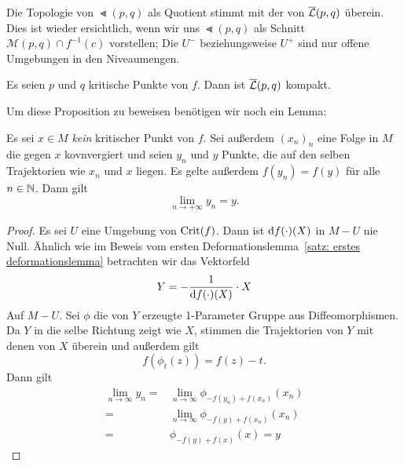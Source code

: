 \begin{remark}
    Die Topologie von $\Lt(p, q)$ als Quotient stimmt mit der von ${\overline{\mathcal{L}} }(p, q)$ überein.
    Dies ist wieder ersichtlich, wenn wir uns $\Lt (p, q)$ als Schnitt 
    $\mathcal{M} (p, q) \cap f^{-1}(c)$ vorstellen; Die $U^-$ beziehungsweise $U^+$ sind nur 
    offene Umgebungen in den Niveaumengen.
\end{remark}

\begin{prop}
    \label{prop: Lb ist kompakt}
    Es seien $p$ und $q$ kritische Punkte von $f$. Dann ist ${\overline{\mathcal{L}} } (p, q)$ kompakt.
\end{prop}

Um diese Proposition zu beweisen benötigen wir noch ein Lemma:

\begin{lemma}
    \label{lemma: konvergenz einer folge}
    Es sei $x \in M$ \emph{kein} kritischer Punkt von $f$. Sei außerdem $(x_n)_n$ eine Folge in
    $M$ die gegen $x$ kovnvergiert und seien $y_n$ und $y$ Punkte, die auf den selben Trajektorien
    wie $x_n$ und $x$ liegen. Es gelte außerdem $f(y_n) = f(y)$ für alle $n \in { \mathbb N }$. Dann gilt
    \[ \lim_{n \to + \infty} y_n = y . \]
\end{lemma}

\begin{proof}
    Es sei $U$ eine Umgebung von ${ \operatorname{Crit} } (f)$. Dann ist ${ \operatorname{d} } f (\cdot) (X)$  in $M - U$ nie Null.
    Ähnlich wie im Beweis vom ersten Deformationslemma~\ref{satz: erstes deformationslemma} betrachten 
    wir das Vektorfeld 
    \[ Y = - \frac{1}{{ \operatorname{d} } f (\cdot) (X)} \cdot X \]
    Auf $M - U$. Sei $\phi$ die von $Y$ erzeugte 1-Parameter Gruppe aus Diffeomorphismen. 
    Da $Y$ in die selbe Richtung zeigt wie $X$, stimmen die Trajektorien von $Y$ mit denen von $X$ 
    überein und außerdem gilt 
    \[ f(\phi_t(z)) = f(z) - t . \]
    Dann gilt
    \begin{align*} 
        \lim_{n \to \infty} y_n  = & \lim_{n \to \infty} \phi_{- f(y_n) + f(x_n)}(x_n) \\
        = & \lim_{n \to \infty} \phi_{- f(y) + f(x_n)}(x_n) \\
        = & \phi_{- f(y) + f(x)}(x) = y
    \end{align*}
\end{proof}

